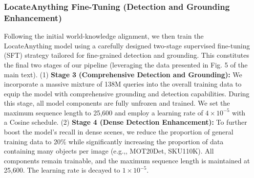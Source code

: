 \documentclass{llmxive}
\providecommand{\eg}{e.g.,\xspace}
\begin{document}
\subsubsection{LocateAnything Fine-Tuning (Detection and Grounding Enhancement)}
Following the initial world-knowledge alignment, we then train the LocateAnything model using a carefully designed two-stage supervised fine-tuning (SFT) strategy tailored for fine-grained detection and grounding. This constitutes the final two stages of our pipeline (leveraging the data presented in Fig. 5 of the main text). 
(1) \textbf{Stage 3 (Comprehensive Detection and Grounding):} We incorporate a massive mixture of 138M queries into the overall training data to equip the model with comprehensive grounding and detection capabilities. During this stage, all model components are fully unfrozen and trained. We set the maximum sequence length to 25,600 and employ a learning rate of $4 \times 10^{-5}$ with a Cosine schedule. 
(2) \textbf{Stage 4 (Dense Detection Enhancement):} To further boost the model's recall in dense scenes, we reduce the proportion of general training data to 20\% while significantly increasing the proportion of data containing many objects per image (\eg, MOT20Det, SKU110K). All components remain trainable, and the maximum sequence length is maintained at 25,600. The learning rate is decayed to $1 \times 10^{-5}$.
\end{document}
